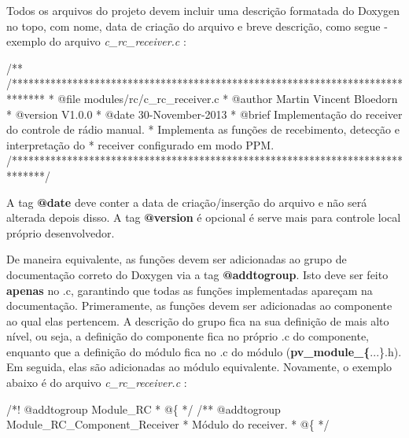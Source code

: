 Todos os arquivos do projeto devem incluir uma descrição formatada do Doxygen no topo, com nome, data de criação do arquivo e breve descrição, como segue -\/ exemplo do arquivo {\itshape c\-\_\-rc\-\_\-receiver.\-c} \-:


\begin{DoxyCode}
\textcolor{comment}{/**}
\textcolor{comment}{  /******************************************************************************}
\textcolor{comment}{  * @file    modules/rc/c\_rc\_receiver.c}
\textcolor{comment}{  * @author  Martin Vincent Bloedorn}
\textcolor{comment}{  * @version V1.0.0}
\textcolor{comment}{  * @date    30-November-2013}
\textcolor{comment}{  * @brief   Implementação do receiver do controle de rádio manual.}
\textcolor{comment}{  *          Implementa as funções de recebimento, detecção e interpretação do}
\textcolor{comment}{  *          receiver configurado em modo PPM.}
\textcolor{comment}{  /******************************************************************************/}
\end{DoxyCode}


A tag {\bfseries @date} deve conter a data de criação/inserção do arquivo e não será alterada depois disso. A tag {\bfseries @version} é opcional é serve mais para controle local próprio desenvolvedor.

De maneira equivalente, as funções devem ser adicionadas ao grupo de documentação correto do Doxygen via a tag {\bfseries @addtogroup}. Isto deve ser feito {\bfseries apenas} no {\itshape }.c, garantindo que todas as funções implementadas apareçam na documentação. Primeramente, as funções devem ser adicionadas ao componente ao qual elas pertencem. A descrição do grupo fica na sua definição de mais alto nível, ou seja, a definição do componente fica no próprio {\itshape }.c do componente, enquanto que a definição do módulo fica no {\itshape }.c do módulo ({\bfseries pv\-\_\-module\-\_\-\{}...{\bfseries }\}.h). Em seguida, elas são adicionadas ao módulo equivalente. Novamente, o exemplo abaixo é do arquivo {\itshape c\-\_\-rc\-\_\-receiver.\-c} \-:


\begin{DoxyCode}
\textcolor{comment}{/*! @addtogroup Module\_RC}
\textcolor{comment}{  * @\{}
\textcolor{comment}{  */}
  \textcolor{comment}{}
\textcolor{comment}{/** @addtogroup Module\_RC\_Component\_Receiver}
\textcolor{comment}{  }
\textcolor{comment}{ *  Módulo do receiver.}
\textcolor{comment}{  * @\{}
\textcolor{comment}{  */}
\end{DoxyCode}


